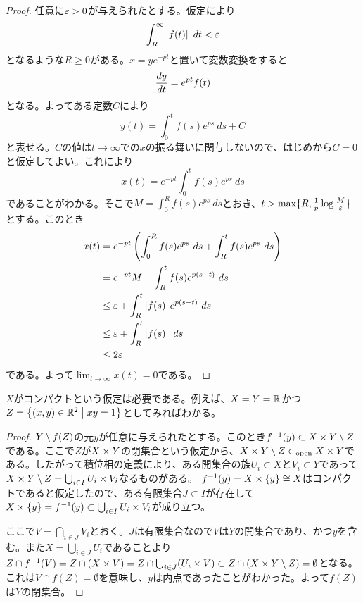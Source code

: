 \begin{proof}
  任意に${\varepsilon} > 0$が与えられたとする。仮定により
  \[
  \int_R^{\infty}  \left \lvert f(t) \right \rvert \ dt < {\varepsilon}
  \]
  となるような$R \geq 0$がある。$x = y e^{-pt}$と置いて変数変換をすると
  \[
  \frac{dy}{dt} = e^{pt}f(t)
  \]
  となる。よってある定数$C$により
  \[
  y(t) = \int_0^t f(s)e^{ps} \ ds + C
  \]
と表せる。$C$の値は$t \to \infty$での$x$の振る舞いに関与しないので、はじめから$C=0$と仮定してよい。これにより
\[
x(t) =  e^{-pt} \int_0^t f(s)e^{ps} \ ds
\]
であることがわかる。そこで$M =  \int_0^R f(s)e^{ps} \ ds $とおき、$ t > \max \{ R, \frac{1}{p} \log \frac{M}{{\varepsilon}} \}$とする。このとき
\begin{align*}
  x(t) &= e^{-pt} \left(  \int_0^R f(s)e^{ps} \ ds  + \int_R^t f(s)e^{ps} \ ds  \right) \\
  &= e^{-pt} M + \int_R^t f(s)e^{p(s-t)} \ ds  \\
  &\leq {\varepsilon} + \int_R^t \left \lvert f(s) \right \rvert e^{p(s-t)} \ ds  \\
  &\leq {\varepsilon} + \int_R^t \left \lvert f(s) \right \rvert  \ ds  \\
  &\leq 2{\varepsilon}
\end{align*}
である。よって$\lim_{t \to \infty} x(t) = 0$である。
\end{proof}



\newpage





\begin{rem}
  $X$がコンパクトという仮定は必要である。例えば、$X=Y={\mathbb R}$かつ$Z=\left\{ (x,y) \in {\mathbb R}^2 \mathrel{} \middle| \mathrel{} xy=1 \right\}$としてみればわかる。
\end{rem}
\begin{proof}
$Y \setminus f(Z)$の元$y$が任意に与えられたとする。このとき$f^{-1}(y) \subset X \times Y \setminus Z$である。ここで$Z$が$X\times Y$の閉集合という仮定から、$X \times Y \setminus Z \subset_{\text{open}} X \times Y$である。したがって積位相の定義により、ある開集合の族$U_i \subset X$と$V_i \subset Y$であって$X \times Y \setminus Z = \bigcup_{i \in I} U_i \times V_i$なるものがある。
$f^{-1}(y) = X \times \{ y \} \cong X$はコンパクトであると仮定したので、ある有限集合$J \subset I$が存在して$X \times \{y\} = f^{-1}(y) \subset \bigcup_{i \in I} U_i \times V_i$が成り立つ。

ここで$V = \bigcap_{i \in J} V_i$とおく。$J$は有限集合なので$V$は$Y$の開集合であり、かつ$y$を含む。また$X = \bigcup_{i \in J} U_i$であることより$Z \cap f^{-1}(V) = Z \cap (X \times V) = Z \cap \bigcup_{i \in J} (U_i \times V) \subset Z \cap (X \times Y \setminus Z) = \emptyset$となる。
これは$V \cap f(Z) = \emptyset$を意味し、$y$は内点であったことがわかった。よって$f(Z)$は$Y$の閉集合。
\end{proof}
